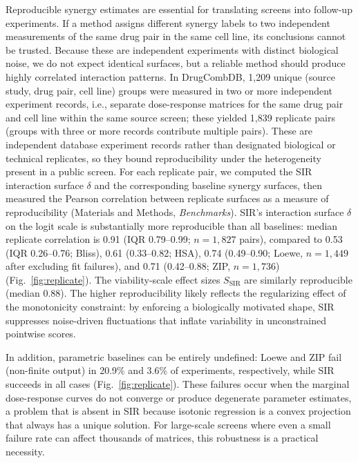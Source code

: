 \documentclass[unnumsec,webpdf,contemporary,large]{oup-authoring-template}
\begin{document}
Reproducible synergy estimates are essential for translating screens into follow-up experiments.
If a method assigns different synergy labels to two independent measurements of the same drug pair in the same cell line, its conclusions cannot be trusted.
Because these are independent experiments with distinct biological noise, we do not expect identical surfaces, but a reliable method should produce highly correlated interaction patterns.
In DrugCombDB, 1{,}209 unique (source study, drug pair, cell line) groups were measured in two or more independent experiment records, i.e., separate dose-response matrices for the same drug pair and cell line within the same source screen; these yielded 1{,}839 replicate pairs (groups with three or more records contribute multiple pairs).
These are independent database experiment records rather than designated biological or technical replicates, so they bound reproducibility under the heterogeneity present in a public screen.
For each replicate pair, we computed the SIR interaction surface $\delta$ and the corresponding baseline synergy surfaces, then measured the Pearson correlation between replicate surfaces as a measure of reproducibility (Materials and Methods, \emph{Benchmarks}).
SIR's interaction surface $\delta$ on the logit scale is substantially more reproducible than all baselines: median replicate correlation is 0.91 (IQR 0.79--0.99; $n=1{,}827$ pairs), compared to 0.53 (IQR 0.26--0.76; Bliss), 0.61 (0.33--0.82; HSA), 0.74 (0.49--0.90; Loewe, $n=1{,}449$ after excluding fit failures), and 0.71 (0.42--0.88; ZIP, $n=1{,}736$) (Fig.~\ref{fig:replicate}).
The viability-scale effect sizes $S_{\mathrm{SIR}}$ are similarly reproducible (median 0.88).
The higher reproducibility likely reflects the regularizing effect of the monotonicity constraint: by enforcing a biologically motivated shape, SIR suppresses noise-driven fluctuations that inflate variability in unconstrained pointwise scores.

In addition, parametric baselines can be entirely undefined: Loewe and ZIP fail (non-finite output) in 20.9\% and 3.6\% of experiments, respectively, while SIR succeeds in all cases (Fig.~\ref{fig:replicate}).
These failures occur when the marginal dose-response curves do not converge or produce degenerate parameter estimates, a problem that is absent in SIR because isotonic regression is a convex projection that always has a unique solution.
For large-scale screens where even a small failure rate can affect thousands of matrices, this robustness is a practical necessity.
\end{document}
